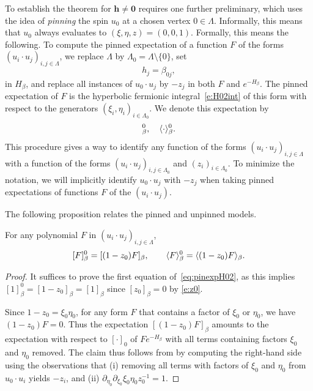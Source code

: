 \documentclass[11pt]{amsart}
\numberwithin{equation}{section}
\numberwithin{theorem}{section}
\newcommand{\V}[1]{\boldsymbol{#1}}
\begin{document}
To establish the theorem for $\V{h} \neq \V{0}$ requires one further
preliminary, which uses the idea of \emph{pinning} the spin
$u_{0}$ at a chosen vertex $0 \in \Lambda$.
Informally, this means that $u_0$
always evaluates to $(\xi,\eta,z) = (0,0,1)$. Formally, this
means the following.
To compute the pinned expectation of a function $F$ of the
forms $(u_{i}\cdot u_{j})_{i,j\in\Lambda}$, we replace
$\Lambda$ by $\Lambda_{0} = \Lambda \setminus \{0\}$, set
\begin{equation} 
  \label{e:h-pinned-02}
  h_j = \beta_{0 j},
\end{equation}
in $H_{\beta}$, and replace all instances of 
$u_0 \cdot u_j$ by $-z_j$ in both $F$ and $e^{-H_{\beta}}$. The
pinned expectation of $F$ is the hyperbolic fermionic
integral~\eqref{e:H02int} of this form with respect to the generators
$(\xi_{i},\eta_{i})_{i\in\Lambda_{0}}$. 
We denote this expectation by 
\begin{equation}
  [\cdot]_\beta^0, \quad \avg{\cdot}_\beta^0.
\end{equation}
This procedure gives a way to identify any function of the
forms $(u_{i}\cdot u_{j})_{i,j\in\Lambda}$ with a function of the
forms $(u_{i}\cdot u_{j})_{i,j\in\Lambda_{0}}$ and
$(z_{i})_{i\in\Lambda_{0}}$. To minimize the notation, we will
implicitly identify $u_{0}\cdot u_{j}$ with $-z_{j}$ when taking
  pinned expectations of functions $F$ of the $(u_{i}\cdot u_{j})$.

The following proposition relates the pinned and unpinned models. 

\begin{proposition}
  \label{prop:pinexpH02}
  For any polynomial $F$ in $(u_i\cdot u_j)_{i,j\in \Lambda}$,
  \begin{equation}
    \label{eq:pinexpH02}
    [F]_\beta^0 = [(1-z_0)F]_\beta,\qquad
    \langle F \rangle_{\beta}^0
    = \langle (1-z_0) F \rangle_\beta.
  \end{equation}
\end{proposition}

\begin{proof}
  It suffices to prove the first equation
  of~\eqref{eq:pinexpH02}, as this implies
  $[1]_{\beta}^{0}=[1-z_{0}]_{\beta}=[1]_{\beta}$ since
  $[z_{0}]_{\beta}=0$ by \eqref{e:z0}. 
  
  Since $1-z_0 = \xi_0\eta_0$, for any form $F$ that contains a factor
  of $\xi_0$ or $\eta_0$, we have $(1-z_0)F=0$.  Thus the expectation
  $[(1-z_0)F]_\beta$ amounts to the expectation with respect to
  $[\cdot]_{0}$ of $F e^{-H_\beta}$ with all terms containing factors
  $\xi_0$ and $\eta_0$ removed.  The claim thus follows from by
  computing the right-hand side using the observations that (i)
  removing all terms with factors of $\xi_0$ and $\eta_0$
  from $u_0\cdot u_i$ yields $-z_i$, and (ii)
  $\partial_{\eta_{0}}\partial_{\xi_{0}}\xi_{0}\eta_{0}z_{0}^{-1}=1$.
\end{proof}
\end{document}
